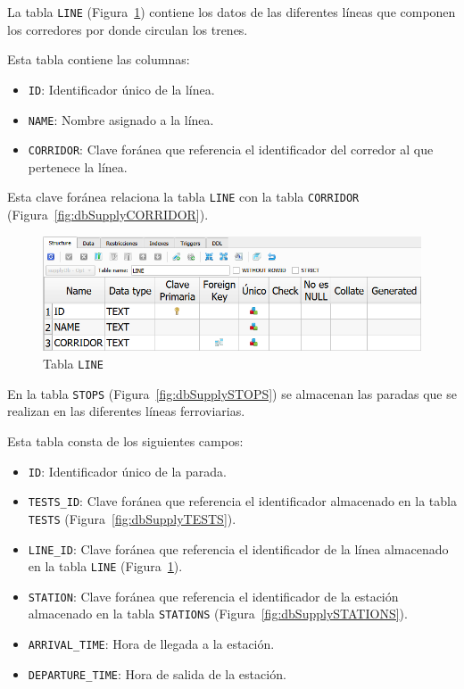 La tabla \texttt{LINE} (Figura~\ref{fig:dbSupplyLINE}) contiene los datos de las diferentes líneas que componen los corredores por donde circulan los trenes. 

Esta tabla contiene las columnas:
\begin{itemize}
    \item \texttt{ID}: Identificador único de la línea.
    \item \texttt{NAME}: Nombre asignado a la línea.
    \item \texttt{CORRIDOR}: Clave foránea que referencia el identificador del corredor al que pertenece la línea.
\end{itemize}

Esta clave foránea relaciona la tabla \texttt{LINE} con la tabla \texttt{CORRIDOR} (Figura~\ref{fig:dbSupplyCORRIDOR}).

\begin{figure}[H]
\centering
\includegraphics[width=.9\textwidth]{fig/Tablas base de datos/Oferta/LINE.png}
\caption{Tabla \texttt{LINE}}
\label{fig:dbSupplyLINE}
\end{figure}

En la tabla \texttt{STOPS} (Figura~\ref{fig:dbSupplySTOPS}) se almacenan las paradas que se realizan en las diferentes líneas ferroviarias. 

Esta tabla consta de los siguientes campos: 
\begin{itemize}
    \item \texttt{ID}: Identificador único de la parada.
    \item \texttt{TESTS\_ID}: Clave foránea que referencia el identificador almacenado en la tabla \texttt{TESTS} (Figura~\ref{fig:dbSupplyTESTS}).
    \item \texttt{LINE\_ID}: Clave foránea que referencia el identificador de la línea almacenado en la tabla \texttt{LINE} (Figura~\ref{fig:dbSupplyLINE}).
    \item \texttt{STATION}: Clave foránea que referencia el identificador de la estación almacenado en la tabla \texttt{STATIONS} (Figura~\ref{fig:dbSupplySTATIONS}).
    \item \texttt{ARRIVAL\_TIME}: Hora de llegada a la estación.
    \item \texttt{DEPARTURE\_TIME}: Hora de salida de la estación.
\end{itemize}

